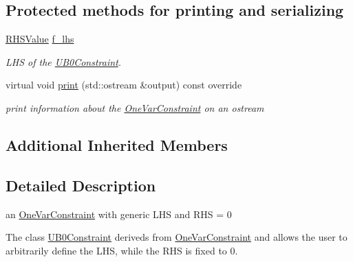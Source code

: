 \subsection*{Protected methods for printing and serializing}
\begin{DoxyCompactItemize}
\item 
\mbox{\label{class_s_m_spp__di__unipi__it_1_1_u_b0_constraint_a4a07fa1468749fabf1ebf66e97011086}} 
\mbox{\hyperlink{class_s_m_spp__di__unipi__it_1_1_row_constraint_a8813536ab3b13a81c8e83a999ade3bd8}{R\+H\+S\+Value}} \mbox{\hyperlink{class_s_m_spp__di__unipi__it_1_1_u_b0_constraint_a4a07fa1468749fabf1ebf66e97011086}{f\+\_\+lhs}}
\begin{DoxyCompactList}\small\item\em L\+HS of the \mbox{\hyperlink{class_s_m_spp__di__unipi__it_1_1_u_b0_constraint}{U\+B0\+Constraint}}. \end{DoxyCompactList}\item 
\mbox{\label{class_s_m_spp__di__unipi__it_1_1_u_b0_constraint_a59a9fcbf8f9f86d348344b2073644b0e}} 
virtual void \mbox{\hyperlink{class_s_m_spp__di__unipi__it_1_1_u_b0_constraint_a59a9fcbf8f9f86d348344b2073644b0e}{print}} (std\+::ostream \&output) const override
\begin{DoxyCompactList}\small\item\em print information about the \mbox{\hyperlink{class_s_m_spp__di__unipi__it_1_1_one_var_constraint}{One\+Var\+Constraint}} on an ostream \end{DoxyCompactList}\end{DoxyCompactItemize}
\subsection*{Additional Inherited Members}


\subsection{Detailed Description}
an \mbox{\hyperlink{class_s_m_spp__di__unipi__it_1_1_one_var_constraint}{One\+Var\+Constraint}} with generic L\+HS and R\+HS = 0 

The class \mbox{\hyperlink{class_s_m_spp__di__unipi__it_1_1_u_b0_constraint}{U\+B0\+Constraint}} deriveds from \mbox{\hyperlink{class_s_m_spp__di__unipi__it_1_1_one_var_constraint}{One\+Var\+Constraint}} and allows the user to arbitrarily define the L\+HS, while the R\+HS is fixed to 0. 

